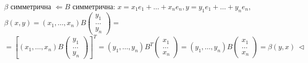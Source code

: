 $\beta$ симметрична $\Leftarrow B$ симметрична: $x = x_1 e_1 + \dots + x_n e_n, y = y_1 e_1 + \dots + y_n e_n$, $\beta(x, y) = (x_1, \dots, x_n) B \begin{pmatrix} y_1 \\ \dots \\ y_n \end{pmatrix} =$ $= \left[ (x_1, \dots, x_n) B \begin{pmatrix} y_1 \\ \dots \\ y_n \end{pmatrix} \right]^T = (y_1, \dots, y_n) B^T \begin{pmatrix} x_1 \\ \dots \\ x_n \end{pmatrix} = (y_1, \dots, y_n) B \begin{pmatrix} x_1 \\ \dots \\ x_n \end{pmatrix} = \beta(y, x) \ \lhd $

